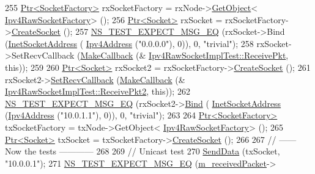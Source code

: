 \begin{DoxyCode}
255   \hyperlink{classns3_1_1Ptr}{Ptr<SocketFactory>} rxSocketFactory = rxNode->\hyperlink{classns3_1_1Object_a13e18c00017096c8381eb651d5bd0783}{GetObject}<
      \hyperlink{classns3_1_1Ipv4RawSocketFactory}{Ipv4RawSocketFactory}> ();
256   \hyperlink{classns3_1_1Ptr}{Ptr<Socket>} rxSocket = rxSocketFactory->\hyperlink{classns3_1_1SocketFactory_a97351e6e7860503a4912042530449f62}{CreateSocket} ();
257   \hyperlink{group__testing_ga7304ba46a28d8cf08dfdfd6499cf7068}{NS\_TEST\_EXPECT\_MSG\_EQ} (rxSocket->Bind (\hyperlink{classns3_1_1InetSocketAddress}{InetSocketAddress} (
      \hyperlink{classns3_1_1Ipv4Address}{Ipv4Address} (\textcolor{stringliteral}{"0.0.0.0"}), 0)), 0, \textcolor{stringliteral}{"trivial"});
258   rxSocket->SetRecvCallback (\hyperlink{group__makecallbackmemptr_ga9376283685aa99d204048d6a4b7610a4}{MakeCallback} (&
      \hyperlink{classIpv4RawSocketImplTest_a25582b4a4bcb5019a7fefc034b6e3ff8}{Ipv4RawSocketImplTest::ReceivePkt}, \textcolor{keyword}{this}));
259 
260   \hyperlink{classns3_1_1Ptr}{Ptr<Socket>} rxSocket2 = rxSocketFactory->\hyperlink{classns3_1_1SocketFactory_a97351e6e7860503a4912042530449f62}{CreateSocket} ();
261   rxSocket2->\hyperlink{classns3_1_1Socket_a243f7835ef1a85f9270fd3577e3a40da}{SetRecvCallback} (\hyperlink{group__makecallbackmemptr_ga9376283685aa99d204048d6a4b7610a4}{MakeCallback} (&
      \hyperlink{classIpv4RawSocketImplTest_aa8913acb80b6b4644629066bfa04222d}{Ipv4RawSocketImplTest::ReceivePkt2}, \textcolor{keyword}{this}));
262   \hyperlink{group__testing_ga7304ba46a28d8cf08dfdfd6499cf7068}{NS\_TEST\_EXPECT\_MSG\_EQ} (rxSocket2->\hyperlink{classns3_1_1Socket_ada93439a43de2028b5a8fc6621dad482}{Bind} (
      \hyperlink{classns3_1_1InetSocketAddress}{InetSocketAddress} (\hyperlink{classns3_1_1Ipv4Address}{Ipv4Address} (\textcolor{stringliteral}{"10.0.1.1"}), 0)), 0, \textcolor{stringliteral}{"trivial"});
263 
264   \hyperlink{classns3_1_1Ptr}{Ptr<SocketFactory>} txSocketFactory = txNode->GetObject<
      \hyperlink{classns3_1_1Ipv4RawSocketFactory}{Ipv4RawSocketFactory}> ();
265   \hyperlink{classns3_1_1Ptr}{Ptr<Socket>} txSocket = txSocketFactory->\hyperlink{classns3_1_1Socket_ad448a62bb50ad3dbac59c879a885a8d2}{CreateSocket} ();
266 
267   \textcolor{comment}{// ------ Now the tests ------------}
268 
269   \textcolor{comment}{// Unicast test}
270   \hyperlink{classIpv4RawSocketImplTest_a62c6104203d0fb2f7688ac216f0d5218}{SendData} (txSocket, \textcolor{stringliteral}{"10.0.0.1"});
271   \hyperlink{group__testing_ga7304ba46a28d8cf08dfdfd6499cf7068}{NS\_TEST\_EXPECT\_MSG\_EQ} (\hyperlink{classIpv4RawSocketImplTest_a38dee32030c77d03c740508d0a68bd22}{m\_receivedPacket}->

\end{DoxyCode}
